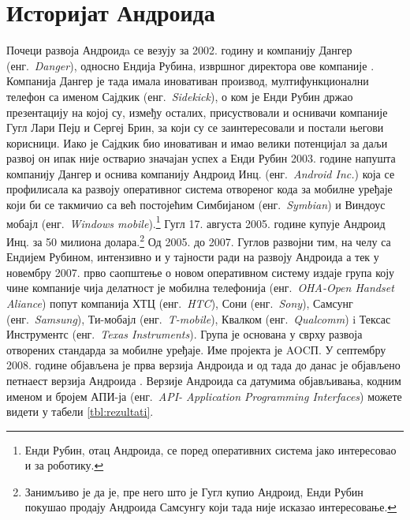 \documentclass[12pt,oneside]{memoir}
\theoremstyle{remark}
\begin{document}
\section{Историјат Андроида}
Почеци развоја Андроидa се везују за 2002. годину и компанију Дангер (енг.~{\em Danger}), односно Ендија Рубина, извршног директора ове компаније \cite{paplukic}. Компанија Дангер је тада имала иновативан производ, мултифункционални телефон са именом Сајдкик (енг.~{\em Sidekick}), о ком је Енди Рубин држао презентацију на којој су, између осталих, присуствовали и оснивачи компаније Гугл Лари Пејџ и Сергеј Брин, за који су се заинтересовали и постали његови корисници. Иако је Сајдкик био иновативан и имао велики потенцијал за даљи развој он ипак није остварио значајан успех а Енди Рубин 2003. године напушта компанију Дангер и оснива компанију Андроид Инц. (енг.~{\em Android Inc.})  која се профилисала ка развоју оперативног система отвореног кода за мобилне уређаје који би се такмичио са већ постојећим Симбијаном (енг.~{\em Symbian}) и Виндоус мобајл (енг.~{\em Windows mobile}).\footnote{Енди Рубин, отац Андроида, се поред оперативних система јако интересовао и за роботику.} Гугл 17. августа 2005. године купује Андроид Инц.  за 50 милиона долара.\footnote{Занимљиво је да је, пре него што је Гугл купио Андроид, Енди Рубин покушао продају Андроида Самсунгу који тада није исказао интересовање. } Од 2005. до 2007. Гуглов развојни тим, на челу са Ендијем Рубином, интензивно и у тајности ради на развоју Андроида а тек у новембру 2007. прво саопштење о новом оперативном систему издаје група коју чине компаније чија делатност је мобилна телефонија (енг.~{\em OHA-Open Handset Aliance}) попут компанија ХТЦ (енг.~{\em HTC}), Сони (енг.~{\em Sony}), Самсунг (енг.~{\em Samsung}), Ти-мобајл (енг.~{\em T-mobile}), Квалком (енг.~{\em Qualcomm}) i Тексас Инструментс (енг.~{\em Texas Instruments}). Група је основана у сврху развоја отворених стандарда за мобилне уређаје. Име пројекта је AOCП. У септембру 2008. године објављена је прва верзија Андроида и од тада до данас је објављено петнаест верзија Андроида \cite{historyandroid}. Верзије Андроида са датумима објављивања, кодним именом и бројем АПИ-ја (енг.~{\em API- Application Programming Interfaces}) можете видети у табели  \ref{tbl:rezultati}.
\end{document}
